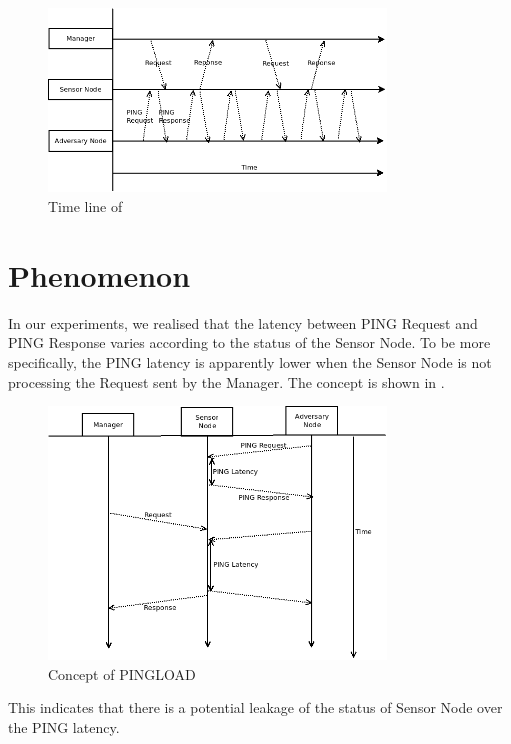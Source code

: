 \begin{figure}[h!]
	\center
	\includegraphics[width=0.8\textwidth]{fig/PINGLOAD_time.png}
	\caption{Time line of }
	\label{Fig: Time line of PINGLOAD}
\end{figure}

\section{Phenomenon}

In our experiments, we realised that the latency between PING Request and PING Response varies according to the status of the Sensor Node. To be more specifically, the PING latency is apparently lower when the Sensor Node is not processing the Request sent by the Manager. The concept is shown in . 

\begin{figure}[h!]
	\center
	\includegraphics[width=0.8\textwidth]{fig/PINGLOAD_concept.png}
	\caption{Concept of PINGLOAD}
	\label{Fig: Concept of PINGLOAD}
\end{figure}

This indicates that there is a potential leakage of the status of Sensor Node over the PING latency.

